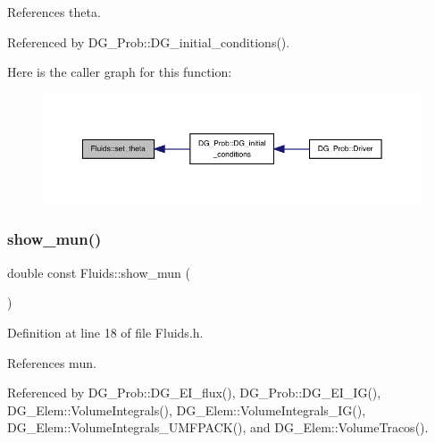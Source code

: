 References theta.



Referenced by D\+G\+\_\+\+Prob\+::\+D\+G\+\_\+initial\+\_\+conditions().

Here is the caller graph for this function\+:
\nopagebreak
\begin{figure}[H]
\begin{center}
\leavevmode
\includegraphics[width=350pt]{classFluids_a7aa55e7d25e0bec0ffa926a9fdb19b22_icgraph}
\end{center}
\end{figure}
\mbox{\label{classFluids_a426336b6a2fe1d6eb97b2af958d0b5e6}} 
\subsubsection{\texorpdfstring{show\+\_\+mun()}{show\_mun()}}
{\footnotesize\ttfamily double const Fluids\+::show\+\_\+mun (\begin{DoxyParamCaption}{ }\end{DoxyParamCaption})\hspace{0.3cm}{\ttfamily [inline]}}



Definition at line 18 of file Fluids.\+h.



References mun.



Referenced by D\+G\+\_\+\+Prob\+::\+D\+G\+\_\+\+E\+I\+\_\+flux(), D\+G\+\_\+\+Prob\+::\+D\+G\+\_\+\+E\+I\+\_\+\+I\+G(), D\+G\+\_\+\+Elem\+::\+Volume\+Integrals(), D\+G\+\_\+\+Elem\+::\+Volume\+Integrals\+\_\+\+I\+G(), D\+G\+\_\+\+Elem\+::\+Volume\+Integrals\+\_\+\+U\+M\+F\+P\+A\+C\+K(), and D\+G\+\_\+\+Elem\+::\+Volume\+Tracos().

